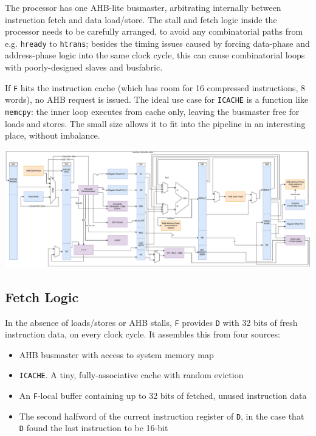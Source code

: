 \documentclass{article}
\begin{document}
The processor has one AHB-lite busmaster, arbitrating internally between instruction fetch and data load/store. The stall and fetch logic inside the processor needs to be carefully arranged, to avoid any combinatorial paths from e.g. \texttt{hready} to \texttt{htrans}; besides the timing issues caused by forcing data-phase and address-phase logic into the same clock cycle, this can cause combinatorial loops with poorly-designed slaves and busfabric.

If \texttt{F} hits the instruction cache (which has room for 16 compressed instructions, 8 words), no AHB request is issued. The ideal use case for \texttt{ICACHE} is a function like \texttt{memcpy}: the inner loop executes from cache only, leaving the busmaster free for loads and stores. The small size allows it to fit into the pipeline in an interesting place, without imbalance.

\newpage

\begin{center}
	\begin{sideways}
		\begin{minipage}{\textheight}
			\includegraphics[width=\textheight]{diagrams/cpu_full.pdf}
			\label{diagram:cpu_pipeline}
		\end{minipage}
	\end{sideways}
\end{center}

\newpage

\subsection{Fetch Logic}

In the absence of loads/stores or AHB stalls, \texttt{F} provides \texttt{D} with 32 bits of fresh instruction data, on every clock cycle. It assembles this from four sources:

\begin{itemize}
\item AHB busmaster with access to system memory map
\item \texttt{ICACHE}. A tiny, fully-associative cache with random eviction
\item An \texttt{F}-local buffer containing up to 32 bits of fetched, unused instruction data
\item The second halfword of the current instruction register of \texttt{D}, in the case that \texttt{D} found the last instruction to be 16-bit
\end{itemize}
\end{document}

